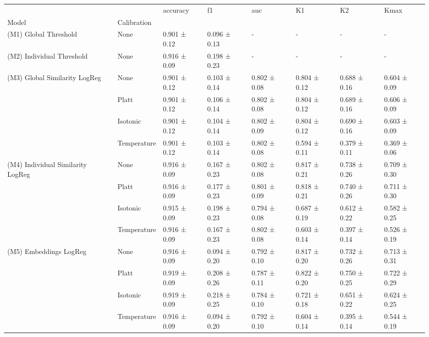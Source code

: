 \begin{tabular}{llllllll}
\toprule
 &  & accuracy & f1 & auc & K1 & K2 & Kmax \\
Model & Calibration &  &  &  &  &  &  \\
\midrule
(M1) Global Threshold & None & 0.901 ± 0.12 & 0.096 ± 0.13 & - & - & - & - \\
\cline{1-8}
(M2) Individual Threshold & None & 0.916 ± 0.09 & 0.198 ± 0.23 & - & - & - & - \\
\cline{1-8}
\multirow[t]{4}{*}{(M3) Global Similarity LogReg} & None & 0.901 ± 0.12 & 0.103 ± 0.14 & 0.802 ± 0.08 & 0.804 ± 0.12 & 0.688 ± 0.16 & 0.604 ± 0.09 \\
 & Platt & 0.901 ± 0.12 & 0.106 ± 0.14 & 0.802 ± 0.08 & 0.804 ± 0.12 & 0.689 ± 0.16 & 0.606 ± 0.09 \\
 & Isotonic & 0.901 ± 0.12 & 0.104 ± 0.14 & 0.802 ± 0.09 & 0.804 ± 0.12 & 0.690 ± 0.16 & 0.603 ± 0.09 \\
 & Temperature & 0.901 ± 0.12 & 0.103 ± 0.14 & 0.802 ± 0.08 & 0.594 ± 0.11 & 0.379 ± 0.11 & 0.369 ± 0.06 \\
\cline{1-8}
\multirow[t]{4}{*}{(M4) Individual Similarity LogReg} & None & 0.916 ± 0.09 & 0.167 ± 0.23 & 0.802 ± 0.08 & 0.817 ± 0.21 & 0.738 ± 0.26 & 0.709 ± 0.30 \\
 & Platt & 0.916 ± 0.09 & 0.177 ± 0.23 & 0.801 ± 0.09 & 0.818 ± 0.21 & 0.740 ± 0.26 & 0.711 ± 0.30 \\
 & Isotonic & 0.915 ± 0.09 & 0.198 ± 0.23 & 0.794 ± 0.08 & 0.687 ± 0.19 & 0.612 ± 0.22 & 0.582 ± 0.25 \\
 & Temperature & 0.916 ± 0.09 & 0.167 ± 0.23 & 0.802 ± 0.08 & 0.603 ± 0.14 & 0.397 ± 0.14 & 0.526 ± 0.19 \\
\cline{1-8}
\multirow[t]{4}{*}{(M5) Embeddings LogReg} & None & 0.916 ± 0.09 & 0.094 ± 0.20 & 0.792 ± 0.10 & 0.817 ± 0.20 & 0.732 ± 0.26 & 0.713 ± 0.31 \\
 & Platt & 0.919 ± 0.09 & 0.208 ± 0.26 & 0.787 ± 0.11 & 0.822 ± 0.20 & 0.750 ± 0.25 & 0.722 ± 0.29 \\
 & Isotonic & 0.919 ± 0.09 & 0.218 ± 0.25 & 0.784 ± 0.10 & 0.721 ± 0.18 & 0.651 ± 0.22 & 0.624 ± 0.25 \\
 & Temperature & 0.916 ± 0.09 & 0.094 ± 0.20 & 0.792 ± 0.10 & 0.604 ± 0.14 & 0.395 ± 0.14 & 0.544 ± 0.19 \\
\cline{1-8}
\bottomrule
\end{tabular}
